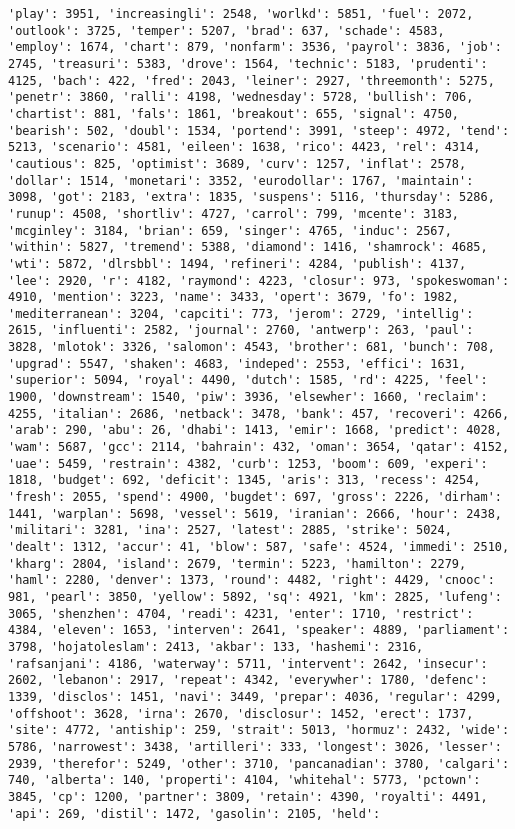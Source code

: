 \documentclass[11pt]{article}
\begin{document}
\begin{Verbatim}[commandchars=\\\{\}]
'play': 3951, 'increasingli': 2548, 'worlkd': 5851, 'fuel': 2072, 'outlook': 3725, 'temper': 5207, 'brad': 637, 'schade': 4583, 'employ': 1674, 'chart': 879, 'nonfarm': 3536, 'payrol': 3836, 'job': 2745, 'treasuri': 5383, 'drove': 1564, 'technic': 5183, 'prudenti': 4125, 'bach': 422, 'fred': 2043, 'leiner': 2927, 'threemonth': 5275, 'penetr': 3860, 'ralli': 4198, 'wednesday': 5728, 'bullish': 706, 'chartist': 881, 'fals': 1861, 'breakout': 655, 'signal': 4750, 'bearish': 502, 'doubl': 1534, 'portend': 3991, 'steep': 4972, 'tend': 5213, 'scenario': 4581, 'eileen': 1638, 'rico': 4423, 'rel': 4314, 'cautious': 825, 'optimist': 3689, 'curv': 1257, 'inflat': 2578, 'dollar': 1514, 'monetari': 3352, 'eurodollar': 1767, 'maintain': 3098, 'got': 2183, 'extra': 1835, 'suspens': 5116, 'thursday': 5286, 'runup': 4508, 'shortliv': 4727, 'carrol': 799, 'mcente': 3183, 'mcginley': 3184, 'brian': 659, 'singer': 4765, 'induc': 2567, 'within': 5827, 'tremend': 5388, 'diamond': 1416, 'shamrock': 4685, 'wti': 5872, 'dlrsbbl': 1494, 'refineri': 4284, 'publish': 4137, 'lee': 2920, 'r': 4182, 'raymond': 4223, 'closur': 973, 'spokeswoman': 4910, 'mention': 3223, 'name': 3433, 'opert': 3679, 'fo': 1982, 'mediterranean': 3204, 'capciti': 773, 'jerom': 2729, 'intellig': 2615, 'influenti': 2582, 'journal': 2760, 'antwerp': 263, 'paul': 3828, 'mlotok': 3326, 'salomon': 4543, 'brother': 681, 'bunch': 708, 'upgrad': 5547, 'shaken': 4683, 'indeped': 2553, 'effici': 1631, 'superior': 5094, 'royal': 4490, 'dutch': 1585, 'rd': 4225, 'feel': 1900, 'downstream': 1540, 'piw': 3936, 'elsewher': 1660, 'reclaim': 4255, 'italian': 2686, 'netback': 3478, 'bank': 457, 'recoveri': 4266, 'arab': 290, 'abu': 26, 'dhabi': 1413, 'emir': 1668, 'predict': 4028, 'wam': 5687, 'gcc': 2114, 'bahrain': 432, 'oman': 3654, 'qatar': 4152, 'uae': 5459, 'restrain': 4382, 'curb': 1253, 'boom': 609, 'experi': 1818, 'budget': 692, 'deficit': 1345, 'aris': 313, 'recess': 4254, 'fresh': 2055, 'spend': 4900, 'bugdet': 697, 'gross': 2226, 'dirham': 1441, 'warplan': 5698, 'vessel': 5619, 'iranian': 2666, 'hour': 2438, 'militari': 3281, 'ina': 2527, 'latest': 2885, 'strike': 5024, 'dealt': 1312, 'accur': 41, 'blow': 587, 'safe': 4524, 'immedi': 2510, 'kharg': 2804, 'island': 2679, 'termin': 5223, 'hamilton': 2279, 'haml': 2280, 'denver': 1373, 'round': 4482, 'right': 4429, 'cnooc': 981, 'pearl': 3850, 'yellow': 5892, 'sq': 4921, 'km': 2825, 'lufeng': 3065, 'shenzhen': 4704, 'readi': 4231, 'enter': 1710, 'restrict': 4384, 'eleven': 1653, 'interven': 2641, 'speaker': 4889, 'parliament': 3798, 'hojatoleslam': 2413, 'akbar': 133, 'hashemi': 2316, 'rafsanjani': 4186, 'waterway': 5711, 'intervent': 2642, 'insecur': 2602, 'lebanon': 2917, 'repeat': 4342, 'everywher': 1780, 'defenc': 1339, 'disclos': 1451, 'navi': 3449, 'prepar': 4036, 'regular': 4299, 'offshoot': 3628, 'irna': 2670, 'disclosur': 1452, 'erect': 1737, 'site': 4772, 'antiship': 259, 'strait': 5013, 'hormuz': 2432, 'wide': 5786, 'narrowest': 3438, 'artilleri': 333, 'longest': 3026, 'lesser': 2939, 'therefor': 5249, 'other': 3710, 'pancanadian': 3780, 'calgari': 740, 'alberta': 140, 'properti': 4104, 'whitehal': 5773, 'pctown': 3845, 'cp': 1200, 'partner': 3809, 'retain': 4390, 'royalti': 4491, 'api': 269, 'distil': 1472, 'gasolin': 2105, 'held': 
\end{Verbatim}
\end{document}
